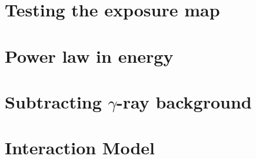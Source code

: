 \appendices


\chapter{Testing the exposure map}
\label{appendix:exposure}


\chapter{Power law in energy}
\label{appendix:pw_energy}


\chapter{Subtracting $\gamma$-ray background}


\chapter{Interaction Model}
\label{appendix:interaction_model}







